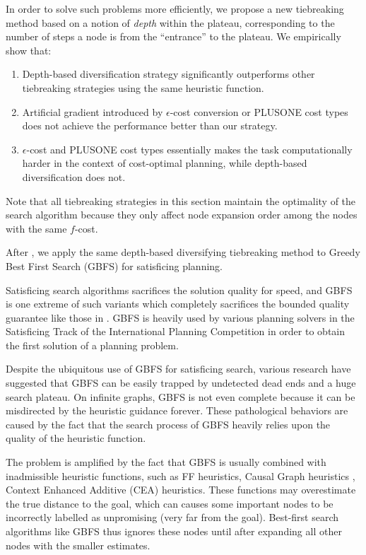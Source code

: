 In order to solve such problems more efficiently, we propose a new
tiebreaking method based on a notion of \emph{depth} within the plateau,
corresponding to the number of steps a node is from the ``entrance'' to
the plateau.  We empirically show that:
\begin{enumerate}
 \item Depth-based diversification strategy significantly outperforms
       other tiebreaking strategies using the same heuristic function.
 \item Artificial gradient introduced by $\epsilon$-cost conversion or
       PLUS\-ONE cost types does not achieve the performance better than
       our strategy.
 \item $\epsilon$-cost and PLUS\-ONE cost types essentially makes the
       task computationally harder in the context of cost-optimal
       planning, while depth-based diversification does not.
\end{enumerate}

Note that all tiebreaking strategies in this section maintain the
optimality of the search algorithm because they only affect node
expansion order among the nodes with the same $f$-cost.


After , we apply the same depth-based diversifying tiebreaking
method to Greedy Best First Search (GBFS) for satisficing planning.

Satisficing search algorithms sacrifices the solution quality for speed,
and GBFS is one extreme of such variants which completely sacrifices the
bounded quality guarantee like those in \astar.  GBFS is heavily used by
various planning solvers in the Satisficing Track of the International
Planning Competition in order to obtain the first solution of a
planning problem.

Despite the ubiquitous use of GBFS for satisficing search,
various research have suggested that GBFS can be
easily trapped by undetected dead ends and a huge search plateau.
On infinite graphs, GBFS is not even complete \cite{Valenzano2016}
because it can be misdirected by the heuristic guidance forever.
These pathological behaviors are caused by the fact that 
the search process of GBFS heavily relies upon the
quality of the heuristic function.

The problem is amplified by the fact that GBFS is usually combined
with inadmissible heuristic functions, such as FF
heuristics\cite{Hoffmann01}, Causal Graph heuristics \cite{Helmert2006}, Context Enhanced
Additive (CEA) heuristics\cite{helmert2008unifying}.
These functions may overestimate the true distance to the goal,
which can causes some important nodes to be incorrectly labelled as unpromising
(very far from the goal). Best-first search algorithms like GBFS thus
ignores these nodes until after expanding all other nodes with the smaller estimates.

